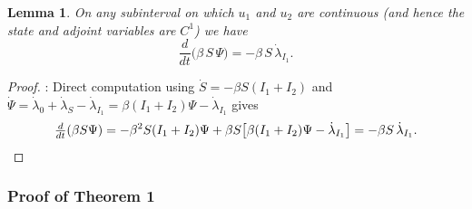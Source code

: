 \documentclass[pdflatex]{sn-jnl}
\newtheorem{lemma}{Lemma}
\theoremstyle{thmstyleone}%
\theoremstyle{thmstyletwo}%
\theoremstyle{thmstylethree}%
\begin{document}
%
\begin{lemma}\label{lem:identity}
On any subinterval on which $u_1$ and $u_2$ are continuous (and hence the state and adjoint variables are $C^1$) we have
\[
\frac{d}{dt}\bigl(\beta\, S\, \Psi\bigr) = -\beta\, S\, \dot\lambda_{I_1}.
\]
\end{lemma}
%
\begin{proof}:
Direct computation using $\dot S = -\beta S(I_1+I_2)$ and $\dot\Psi = \dot\lambda_0+\dot\lambda_S - \dot\lambda_{I_1} = \beta(I_1+I_2)\Psi - \dot\lambda_{I_1}$ gives
\[
\tfrac{d}{dt}(\beta S\Psi) = -\beta^2 S(I_1+I_2)\Psi + \beta S\bigl[\beta(I_1+I_2)\Psi - \dot\lambda_{I_1}\bigr] = -\beta S\,\dot\lambda_{I_1}. \qedhere
\]
\end{proof}
%
\subsubsection{Proof of Theorem 1}
\end{document}
